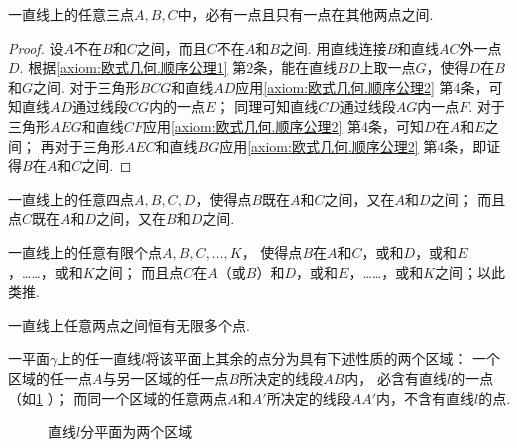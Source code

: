 \begin{theorem}\label{theorem:欧式几何.定理4}
一直线上的任意三点\(A,B,C\)中，必有一点且只有一点在其他两点之间.
\begin{proof}
设\(A\)不在\(B\)和\(C\)之间，而且\(C\)不在\(A\)和\(B\)之间.
用直线连接\(B\)和直线\(AC\)外一点\(D\).
根据\cref{axiom:欧式几何.顺序公理1} 第2条，能在直线\(BD\)上取一点\(G\)，使得\(D\)在\(B\)和\(G\)之间.
对于三角形\(BCG\)和直线\(AD\)应用\cref{axiom:欧式几何.顺序公理2} 第4条，可知直线\(AD\)通过线段\(CG\)内的一点\(E\)；
同理可知直线\(CD\)通过线段\(AG\)内一点\(F\).
对于三角形\(AEG\)和直线\(CF\)应用\cref{axiom:欧式几何.顺序公理2} 第4条，可知\(D\)在\(A\)和\(E\)之间；
再对于三角形\(AEC\)和直线\(BG\)应用\cref{axiom:欧式几何.顺序公理2} 第4条，即证得\(B\)在\(A\)和\(C\)之间.
\end{proof}
\end{theorem}

\begin{theorem}\label{theorem:欧式几何.定理5}
一直线上的任意四点\(A,B,C,D\)，使得点\(B\)既在\(A\)和\(C\)之间，又在\(A\)和\(D\)之间；
而且点\(C\)既在\(A\)和\(D\)之间，又在\(B\)和\(D\)之间.
\end{theorem}

\begin{corollary}\label{theorem:欧式几何.定理6}
一直线上的任意有限个点\(A,B,C,\dotsc,K\)，%
使得点\(B\)在\(A\)和\(C\)，或和\(D\)，或和\(E\)，……，或和\(K\)之间；
而且点\(C\)在\(A\)（或\(B\)）和\(D\)，或和\(E\)，……，或和\(K\)之间；以此类推.
\end{corollary}

\begin{corollary}\label{theorem:欧式几何.定理7}
一直线上任意两点之间恒有无限多个点.
\end{corollary}

\begin{theorem}\label{theorem:欧式几何.定理8}
一平面\(\gamma\)上的任一直线\(l\)将该平面上其余的点分为具有下述性质的两个区域：
一个区域的任一点\(A\)与另一区域的任一点\(B\)所决定的线段\(AB\)内，%
必含有直线\(l\)的一点（如\cref{figure:欧式几何.直线l分平面为两个区域} ）；%
而同一个区域的任意两点\(A\)和\(A'\)所决定的线段\(AA'\)内，不含有直线\(l\)的点.
\begin{figure}[ht]
\centering
{}
\caption{直线\(l\)分平面为两个区域}
\label{figure:欧式几何.直线l分平面为两个区域}
\end{figure}
\end{theorem}

